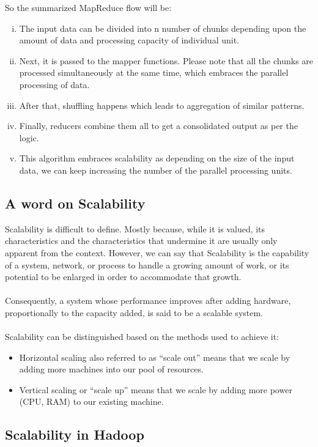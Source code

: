 \documentclass[a4paper,12pt,oneside]{report}
\begin{document}
So the summarized MapReduce flow will be:
\begin{enumerate}[(i)]
        \item The input data can be divided into n number of chunks depending upon the amount of data and processing capacity of individual unit.
        \item Next, it is passed to the mapper functions. Please note that all the chunks are processed simultaneously at the same time, which embraces the parallel processing of data.
        \item After that, shuffling happens which leads to aggregation of similar patterns.
        \item Finally, reducers combine them all to get a consolidated output as per the logic.
        \item This algorithm embraces scalability as depending on the size of the input data, we can keep increasing the number of the parallel processing units.
\end{enumerate}

\subsection{A word on Scalability}

Scalability is difficult to define. \cite{Hill1990} Mostly because, while it is valued, its characteristics and
the characteristics that undermine it are usually only apparent from the context. However,
we can say that Scalability is the capability of a system, network, or process to handle a
growing amount of work, or its potential to be enlarged in order to accommodate that
growth. \cite{Bondi2000}\\
\\
Consequently, a system whose performance improves after adding hardware,
proportionally to the capacity added, is said to be a scalable system.\\
\\
Scalability can be distinguished based on the methods used to achieve it:
\begin{itemize}
        \item Horizontal scaling also referred to as “scale out” means that we scale by adding more
machines into our pool of resources.
\item Vertical scaling or “scale up” means that we scale by adding more power (CPU, RAM) to
our existing machine.
\end{itemize}

\subsection{Scalability in Hadoop}
\end{document}
